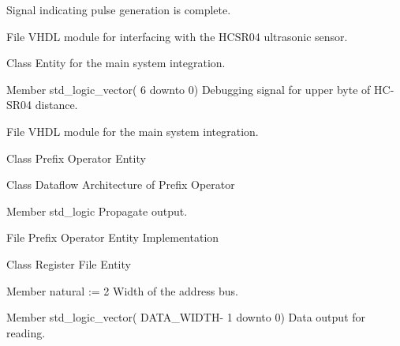 \begin{DoxyRefList}
%
 Signal indicating pulse generation is complete.  
\item[File \doxylink{hcsr04__interface_8vhdl}{hcsr04\+\_\+interface.vhdl} ]\label{brief__brief000109}%
%
 VHDL module for interfacing with the HCSR04 ultrasonic sensor.  
\item[Class \doxylink{classmain}{main} ]\label{brief__brief000122}%
%
 Entity for the main system integration.  
\item[Member \doxylink{classmain_afea280bba5f8db4afa551c47088c77a6}{main.db\+\_\+dist\+\_\+h1} std\+\_\+logic\+\_\+vector( 6 downto  0) ]\label{brief__brief000123}%
%
 Debugging signal for upper byte of HC-\/\+SR04 distance.  
\item[File \doxylink{main_8vhdl}{main.vhdl} ]\label{brief__brief000121}%
%
 VHDL module for the main system integration.  
\item[Class \doxylink{classprefix__operator}{prefix\+\_\+operator} ]\label{brief__brief000002}%
%
 Prefix Operator Entity 
\item[Class \doxylink{classprefix__operator_1_1dataflow}{prefix\+\_\+operator.dataflow} ]\label{brief__brief000004}%
%
 Dataflow Architecture of Prefix Operator 
\item[Member \doxylink{classprefix__operator_a3d0e56e7ace0f89e409185c135055ec2}{prefix\+\_\+operator.p} std\+\_\+logic ]\label{brief__brief000003}%
%
 Propagate output.  
\item[File \doxylink{prefix__operator_8vhdl}{prefix\+\_\+operator.vhdl} ]\label{brief__brief000001}%
%
 Prefix Operator Entity Implementation 
\item[Class \doxylink{classreg__file}{reg\+\_\+file} ]\label{brief__brief000039}%
%
 Register File Entity 
\item[Member \doxylink{classreg__file_aa743b3ca5c40506bdf726a9631d3717a}{reg\+\_\+file.ADDR\+\_\+\+WIDTH} natural \+:= 2]\label{brief__brief000040}%
%
 Width of the address bus.  
\item[Member \doxylink{classreg__file_a36d8aa71ffe3ac859b8553aaf2542c20}{reg\+\_\+file.r\+\_\+data} std\+\_\+logic\+\_\+vector( DATA\+\_\+\+WIDTH-\/ 1 downto 0) ]\label{brief__brief000041}%
%
 Data output for reading.  

\end{DoxyRefList}
